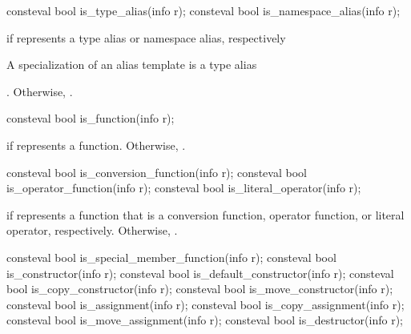%
%
\begin{itemdecl}
consteval bool is_type_alias(info r);
consteval bool is_namespace_alias(info r);
\end{itemdecl}

\begin{itemdescr}
\pnum
\returns
{} if  represents a type alias or namespace alias, respectively
\begin{note}
A specialization of an alias template is a type alias
\end{note}
. %
Otherwise, .
\end{itemdescr}

%
\begin{itemdecl}
consteval bool is_function(info r);
\end{itemdecl}

\begin{itemdescr}
\pnum
\returns
{} if  represents a function.
Otherwise, .
\end{itemdescr}

%
%
%
\begin{itemdecl}
consteval bool is_conversion_function(info r);
consteval bool is_operator_function(info r);
consteval bool is_literal_operator(info r);
\end{itemdecl}

\begin{itemdescr}
\pnum
\returns
{} if  represents a function that is a
conversion function,
operator function, or
literal operator, respectively.
Otherwise, .
\end{itemdescr}

%
%
%
%
%
%
%
%
%
\begin{itemdecl}
consteval bool is_special_member_function(info r);
consteval bool is_constructor(info r);
consteval bool is_default_constructor(info r);
consteval bool is_copy_constructor(info r);
consteval bool is_move_constructor(info r);
consteval bool is_assignment(info r);
consteval bool is_copy_assignment(info r);
consteval bool is_move_assignment(info r);
consteval bool is_destructor(info r);
\end{itemdecl}

